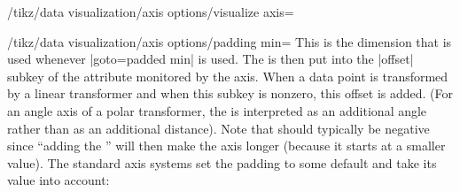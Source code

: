 \begin{key}{/tikz/data visualization/axis options/visualize axis=}
    \begin{key}{/tikz/data visualization/axis options/padding min=}
        This is the dimension that is used whenever |goto=padded min| is used.
        The  is then put into the |offset| subkey of the
        attribute monitored by the axis. When a data point is transformed by a
        linear transformer and when this subkey is nonzero, this offset is
        added. (For an angle axis of a polar transformer, the 
        is interpreted as an additional angle rather than as an additional
        distance). Note that  should typically be negative
        since ``adding the '' will then make the axis longer
        (because it starts at a smaller value). The standard axis systems set
        the padding to some default and take its value into account:
\begin{codeexample}[
    width=8cm,
    preamble={\usetikzlibrary{datavisualization.formats.functions}},
]
\end{codeexample}


\end{key}
\end{key}
